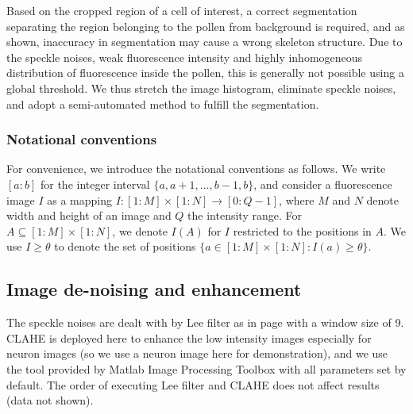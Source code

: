 
Based on the cropped region of a cell of interest, a correct segmentation separating the region belonging to the pollen from background is required, and as  shown, inaccuracy in segmentation may cause a wrong skeleton structure. Due to the speckle noises, weak fluorescence intensity and highly inhomogeneous distribution of fluorescence inside the pollen, this is generally not possible using a global threshold. We thus stretch the image histogram, eliminate speckle noises, and adopt a semi-automated method to fulfill the segmentation.



\subsubsection{Notational conventions}

For convenience, we introduce the notational conventions as follows. We write $[a:b]$ for the integer interval $\{a,a+1,\dots,b-1,b\}$, and consider a fluorescence image $I$ as a mapping $I\colon [1:M]\times[1:N]\to[0:Q-1]$, where $M$ and $N$ denote width and height of an image and $Q$ the intensity range. For $A\subseteq[1:M]\times[1:N]$, we denote $I(A)$ for $I$ restricted to the positions in $A$. We use $I\ge\theta$ to denote the set of positions $\{a\in[1:M]\times[1:N]\colon I(a)\ge\theta\}$.

\subsection{Image de-noising and enhancement}

The speckle noises are dealt with by Lee filter as in page \pageref{subsubsec: speckle} with a window size of 9. \ac{CLAHE} is deployed here to enhance the low intensity images especially for neuron images (so we use a neuron image here for demonstration), and we use the tool provided by Matlab Image Processing Toolbox with all parameters set by default. The order of executing Lee filter and CLAHE does not affect results (data not shown).

